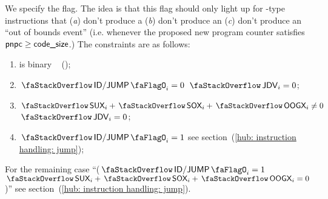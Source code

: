 \begin{center}
\end{center}
We specify the \stackJumpDestinationVetting{} flag. The idea is that this flag should only light up for -type instructions that
(\emph{a}) don't produce a \suxSH{}
(\emph{b}) don't produce an \oogxSH{}
(\emph{c}) don't produce an ``out of bounds event'' (i.e. whenever the proposed new program counter  satisfies $\textsf{pnpc} \geq \textsf{code\_size}$.)
The constraints are as follows:
\begin{enumerate}
	\item \stackJumpDestinationVetting{} is binary ~ (\trash);
	\item \If $\stackDecJumpFlag_{i} = 0$ \Then $\stackJumpDestinationVetting_{i} = 0$;
	\item \If $\stackSux_{i} + \stackSox_{i} + \stackOogx_{i} \neq 0$ \Then $\stackJumpDestinationVetting_{i} = 0$;
	\item \If $\stackDecJumpFlag_{i} = 1$ \Then see section~(\ref{hub: instruction handling: jump});
\end{enumerate}
For the remaining case ``\If \Big($\stackDecJumpFlag_{i} = 1$ \et $\stackSux_{i} + \stackSox_{i} + \stackOogx_{i} = 0$\Big)'' see section~(\ref{hub: instruction handling: jump}).
